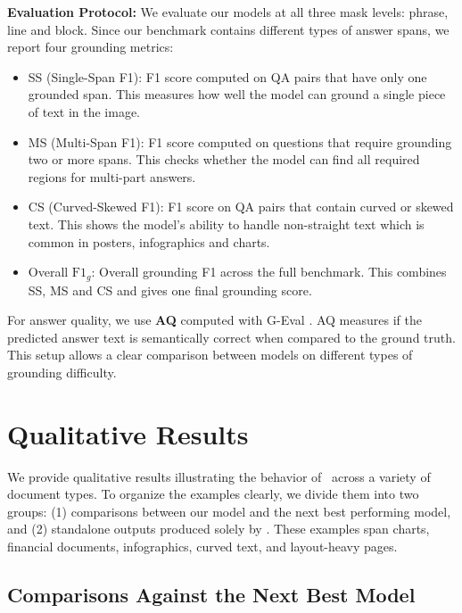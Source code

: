 \noindent \textbf{Evaluation Protocol:}
We evaluate our models at all three mask levels: phrase, line and block.  
Since our benchmark contains different types of answer spans, we report four grounding metrics:

\begin{itemize}
    \item SS (Single-Span F1): F1 score computed on QA pairs that have only one grounded span. This measures how well the model can ground a single piece of text in the image.
    \item MS (Multi-Span F1): F1 score computed on questions that require grounding two or more spans. This checks whether the model can find all required regions for multi-part answers.
    \item CS (Curved-Skewed F1): F1 score on QA pairs that contain curved or skewed text. This shows the model’s ability to handle non-straight text which is common in posters, infographics and charts.
    \item Overall $\text{F1}_{g}$: Overall grounding F1 across the full benchmark. This combines SS, MS and CS and gives one final grounding score.
\end{itemize}

For answer quality, we use \textbf{AQ} computed with G-Eval \cite{liu2023geval}. AQ measures if the predicted answer text is semantically correct when compared to the ground truth. This setup allows a clear comparison between models on different types of grounding difficulty.


\section{Qualitative Results}
\label{sec:qualitative}

We provide qualitative results illustrating the behavior of \modelName\ across a variety of document types. 
To organize the examples clearly, we divide them into two groups:
(1) comparisons between our model and the next best performing model, and 
(2) standalone outputs produced solely by \modelName{}.
These examples span charts, financial documents, infographics, curved text, and layout-heavy pages.

\subsection{Comparisons Against the Next Best Model}


